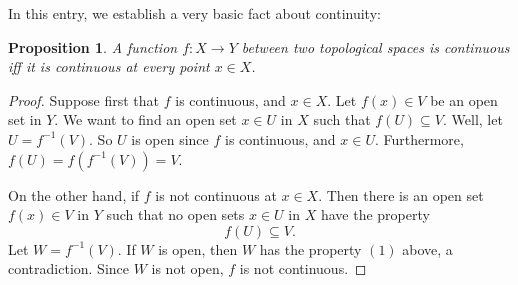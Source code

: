 \documentclass[12pt]{article}
\newtheorem{prop}{Proposition}
\begin{document}
In this entry, we establish a very basic fact about continuity:

\begin{prop} A function $f:X\to Y$ between two topological spaces is continuous iff it is continuous at every point $x\in X$. \end{prop}
\begin{proof}
Suppose first that $f$ is continuous, and $x\in X$.  Let $f(x)\in V$ be an open set in $Y$.  We want to find an open set $x\in U$ in $X$ such that $f(U)\subseteq V$.  Well, let $U=f^{-1}(V)$.  So $U$ is open since $f$ is continuous, and $x\in U$.  Furthermore, $f(U) = f(f^{-1}(V))=V$.

On the other hand, if $f$ is not continuous at $x \in X$.  Then there is an open set $f(x)\in V$ in $Y$ such that no open sets $x\in U$ in $X$ have the property 
\begin{equation}
f(U)\subseteq V.
\end{equation}  
Let $W=f^{-1}(V)$.  If $W$ is open, then $W$ has the property $(1)$ above, a contradiction.  Since $W$ is not open, $f$ is not continuous.
\end{proof}
\end{document}
